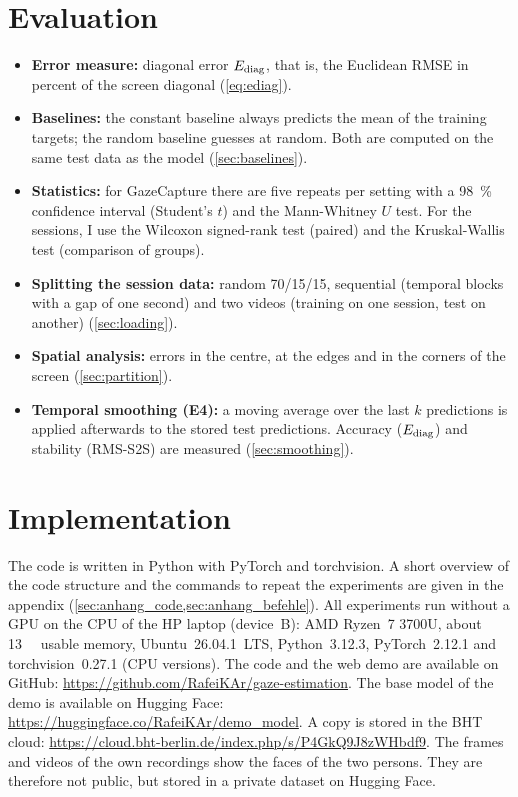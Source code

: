 \section{Evaluation}
\label{sec:meth_evaluation}
\begin{itemize}
  \item \textbf{Error measure:} diagonal error $E_{\mathrm{diag}}$, that is, the Euclidean
        RMSE in percent of the screen diagonal (\cref{eq:ediag}).
  \item \textbf{Baselines:} the constant baseline always predicts the mean of
        the training targets; the random baseline guesses at random. Both are
        computed on the same test data as the model (\cref{sec:baselines}).
  \item \textbf{Statistics:} for GazeCapture there are five repeats per setting
        with a \SI{98}{\percent} confidence interval (Student's $t$) and the
        Mann-Whitney $U$ test. For the sessions, I use the Wilcoxon signed-rank
        test (paired) and the Kruskal-Wallis test (comparison of groups).
  \item \textbf{Splitting the session data:} random 70/15/15, sequential
        (temporal blocks with a gap of one second) and two videos (training on
        one session, test on another) (\cref{sec:loading}).
  \item \textbf{Spatial analysis:} errors in the centre, at the edges and in the
        corners of the screen (\cref{sec:partition}).
  \item \textbf{Temporal smoothing (E4):} a moving average over the last $k$
        predictions is applied afterwards to the stored test predictions.
        Accuracy ($E_{\mathrm{diag}}$) and stability (RMS-S2S) are measured
        (\cref{sec:smoothing}).
\end{itemize}

\section{Implementation}
\label{sec:meth_implementierung}
The code is written in Python with PyTorch and torchvision. A short overview of
the code structure and the commands to repeat the experiments are given in the
appendix (\cref{sec:anhang_code,sec:anhang_befehle}).
All experiments run without a GPU on the CPU of the HP laptop
(device~B): AMD Ryzen~7 3700U, about \SI{13}{\giga\byte} usable memory,
Ubuntu~26.04.1~LTS, Python~3.12.3, PyTorch~2.12.1 and torchvision~0.27.1
(CPU versions). The code and the web demo are
available on GitHub: \url{https://github.com/RafeiKAr/gaze-estimation}. The base model of the demo is
available on Hugging Face: \url{https://huggingface.co/RafeiKAr/demo_model}. A copy
is stored in the BHT cloud:
\url{https://cloud.bht-berlin.de/index.php/s/P4GkQ9J8zWHbdf9}. The frames
and videos of the own recordings show the faces of the two persons. They are therefore not
public, but stored in a private dataset on Hugging Face.


